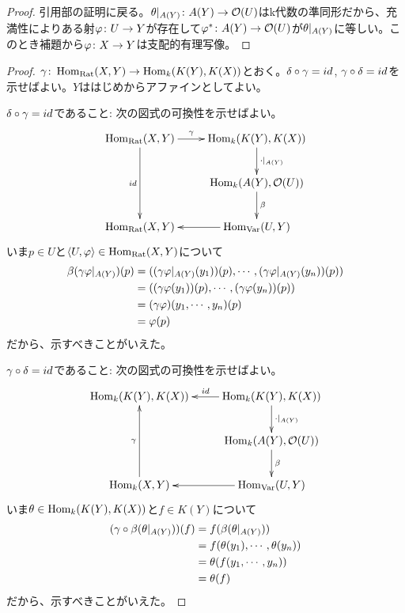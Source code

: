 \begin{proof}
  引用部の証明に戻る。${\theta} |_{A(Y)} \colon A(Y) \to \mathcal{O}(U)$はk代数の準同形だから、充満性によりある射${\varphi} \colon U \to Y$が存在して${\varphi}^* \colon A(Y) \to \mathcal{O}(U)$が${\theta} |_{A(Y)}$に等しい。このとき補題から${\varphi} \colon X \to Y$は支配的有理写像。
\end{proof}


\begin{proof}
  ${\gamma} \colon \operatorname{Hom}_{\text{Rat}} (X,Y) \to \operatorname{Hom}_k(K(Y), K(X))$とおく。${\delta} \circ {\gamma} = id$, ${\gamma} \circ {\delta} = id$を示せばよい。$Y$ははじめからアファインとしてよい。

    ${\delta} \circ {\gamma} = id$であること:
    次の図式の可換性を示せばよい。
    \[
    \xymatrix{
    \Hom_{\text{Rat}}(X,Y) \ar[r]^-{\grg} \ar[dd]_{id} & \Hom_k(K(Y),K(X)) \ar[d]^{\cdot |_{A(Y)}} \\
    {} & \Hom_k(A(Y), \calo(U)) \ar[d]^{\beta} \\
\Hom_{\text{Rat}}(X,Y) & \Hom_{\text{Var}}(U,Y) \ar[l]
    }
    \]
    いま$p \in U$と$\langle U,{\varphi} \rangle \in \operatorname{Hom}_{\text{Rat}}(X,Y)$について
    \begin{align*}
      \beta ({\gamma} {\varphi} |_{A(Y)})(p) &= (( {\gamma} {\varphi} |_{A(Y)}(y_1) )(p), \cdots , ( {\gamma} {\varphi} |_{A(Y)}(y_n) )(p)) \\
      &= (( {\gamma} {\varphi} (y_1) )(p), \cdots , ( {\gamma} {\varphi} (y_n) )(p)) \\
      &= ({\gamma} {\varphi})(y_1, \cdots , y_n)(p) \\
      &= {\varphi}(p)
    \end{align*}
    だから、示すべきことがいえた。

${\gamma} \circ {\delta} = id$であること:
次の図式の可換性を示せばよい。
\[
\xymatrix{
\Hom_{k}(K(Y),K(X))   & \Hom_k(K(Y),K(X)) \ar[d]^{\cdot |_{A(Y)}} \ar[l]_-{id} \\
{} & \Hom_k(A(Y), \calo(U)) \ar[d]^-{\beta} \\
\Hom_{k}(X,Y) \ar[uu]^-{\grg} & \Hom_{\text{Var}}(U,Y) \ar[l]
}
\]
いま${\theta} \in \operatorname{Hom}_k(K(Y), K(X))$と$f \in K(Y)$について
\begin{align*}
  ({\gamma} \circ \beta ({\theta}|_{A(Y)}) )(f) &= f(\beta({\theta}|_{A(Y)})) \\
  &= f({\theta}(y_1), \cdots , {\theta}(y_n)) \\
  &= {\theta}(f(y_1, \cdots , y_n)) \\
  &= {\theta}(f)
\end{align*}
だから、示すべきことがいえた。
\end{proof}






